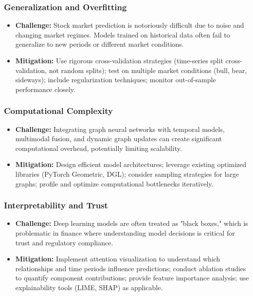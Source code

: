 \subsubsection{Generalization and Overfitting}
\begin{itemize}
    \item \textbf{Challenge:} Stock market prediction is notoriously difficult due to noise and changing market regimes. Models trained on historical data often fail to generalize to new periods or different market conditions.
    \item \textbf{Mitigation:} Use rigorous cross-validation strategies (time-series split cross-validation, not random splits); test on multiple market conditions (bull, bear, sideways); include regularization techniques; monitor out-of-sample performance closely.
\end{itemize}

\subsubsection{Computational Complexity}
\begin{itemize}
    \item \textbf{Challenge:} Integrating graph neural networks with temporal models, multimodal fusion, and dynamic graph updates can create significant computational overhead, potentially limiting scalability.
    \item \textbf{Mitigation:} Design efficient model architectures; leverage existing optimized libraries (PyTorch Geometric, DGL); consider sampling strategies for large graphs; profile and optimize computational bottlenecks iteratively.
\end{itemize}

\subsubsection{Interpretability and Trust}
\begin{itemize}
    \item \textbf{Challenge:} Deep learning models are often treated as "black boxes," which is problematic in finance where understanding model decisions is critical for trust and regulatory compliance.
    \item \textbf{Mitigation:} Implement attention visualization to understand which relationships and time periods influence predictions; conduct ablation studies to quantify component contributions; provide feature importance analysis; use explainability tools (LIME, SHAP) as applicable.
\end{itemize}

